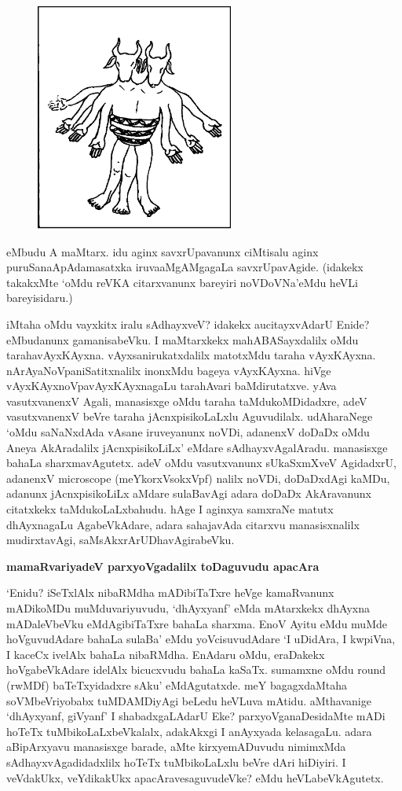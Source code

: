\begin{figure}
\includegraphics[width=6.5cm]{0208.eps}
\end{figure}

\noindent
eMbudu A maMtarx. idu aginx savxrUpa\-vanunx ciMti\-salu aginx puruSana\break ApAda\-masatxka iruva\break aMgAMgagaLa savxrUpa\break\-vAgide. (idakekx takakxMte `oMdu reVKA citarx\-vanunx bareyiri noVDoVNa'\break eMdu heVLi bareyi\break\-sidaru.)

iMtaha oMdu vayxkitx iralu sAdhayxveV? idakekx aucitayxvAdarU Enide?\break eMbu\-danunx gama\-nisabeVku. I maMtarxkekx mahABASayx\-dalilx oMdu taraha\break vAyxKAyxna. vAyxsanirukatx\-dalilx ma\-totxMdu taraha vAyxKAyxna. nArAyaNoVpa\-niSatitxnalilx inonxMdu bageya vAyxKAyxna. hiVge vAyxKAyxnoVpavAyxKAyxnagaLu tarahAvari baMdi\-rutatxve. yAva vasutxvanenxV Agali, mana\-sisxge oMdu taraha taMdukoMDidadxre, adeV vasutx\-vanenxV beVre taraha jAcnxpisi\-koLaLxlu Aguvu\-dilalx. udAharaNege `oMdu saNaNxdAda vAsane iruve\-yanunx noVDi, adanenxV doDaDx oMdu Aneya AkAradalilx jAcnxpisikoLiLx' eMdare sAdhayxvAga\-lAradu. manasisxge bahaLa sharxmavAgutetx. adeV  oMdu vasutxvanunx sUkaSxmXveV Agi\-dadxrU, adanenxV {\rm micro\-scope} (meYkorxVsokxVpf) nalilx noVDi, doDaDxdAgi kaMDu, adanunx jAcnxpisikoLiLx aMdare sulaBa\-vAgi adara doDaDx AkAravanunx citatxkekx taMdu\-koLaLxbahudu. hAge I aginxya samxraNe matutx dhAyxnagaLu AgabeVkAdare, adara sahajavAda citarxvu manasisxnalilx mudirxtavAgi, saMsAkxrArUDhavAgirabeVku.

\newpage

{\bigskip
\noindent
{\large\bf mamaRvariyadeV parxyoVgadalilx toDaguvudu apacAra}}\label{page209}
\medskip

\noindent
`Enidu? iSeTxlAlx nibaRMdha mADibiTaTxre heVge kamaRvanunx mADikoMDu muMduvariyuvudu, `dhAyxyanf' eMda mAtarxkekx dhAyxna mADaleVbeVku eMdAgibiTaTxre bahaLa sharxma. EnoV Ayitu eMdu muMde hoVguvudAdare bahaLa sulaBa' eMdu yoVcisuvudAdare `I uDidAra, I kwpiVna, I kaceCx ivelAlx bahaLa nibaRMdha. EnAdaru oMdu, eraDakekx hoVgabeVkAdare idelAlx bicucxvudu bahaLa kaSaTx. sumamxne oMdu {\rm round} (rwMDf) baTeTxyidadxre sAku' eMdAgutatxde. meY bagagxdaMtaha soVMbeVri\-yobabx tuMDAMDiyAgi beLedu heVLuva mAtidu. aMthavanige `dhAyxyanf, giVyanf' I shabadxgaLAdarU Eke? parxyoVganaDesidaMte mADi hoTeTx tuMbikoLaLxbeVkalalx, adakAkxgi I anAyxyada kelasagaLu. adara aBi\-pArxyavu manasisxge barade, aMte kirxyemADuvudu nimimxMda sAdhayxvAgadidadxlilx hoTeTx tuMbikoLaLxlu beVre dAri hiDiyiri. I veVdakUkx, veYdikakUkx apacAravesaguvudeVke? eMdu heVLabeVkAgutetx.

